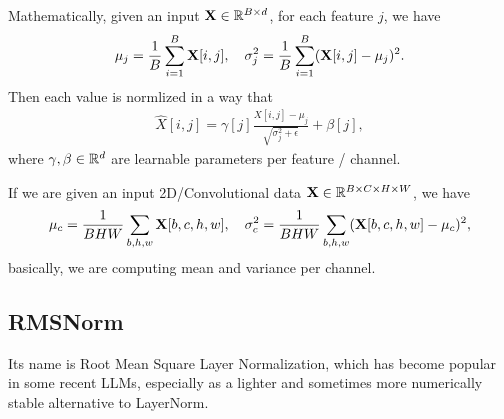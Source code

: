 \documentclass[11pt]{article}  %
\begin{document}
Mathematically, given an input $\mathbf{X} \in \mathbb{R}^{B \times d}$, for each feature $j$, we have 
\begin{align*}
  \mu_j = \frac{1}{B}\sum_{i=1}^{B}\mathbf{X}[i, j], \quad \sigma^2_j = \frac{1}{B}\sum_{i=1}^{B}(\mathbf{X}[i, j] - \mu_j)^2.
\end{align*}
Then each value is normlized in a way that 
\begin{align*}
  \hat{X}[i, j] = \gamma[j] \frac{X[i, j] - \mu_j}{\sqrt{\sigma_j^2 + \epsilon}} + \beta[j],
\end{align*}
where $\gamma, \beta \in \mathbb{R}^d$ are learnable parameters per feature / channel.

If we are given an input 2D/Convolutional data $\mathbf{X} \in \mathbb{R}^{B \times C \times H \times W}$, we have 
\begin{align*}
  \mu_c = \frac{1}{BHW}\sum_{b,h,w}\mathbf{X}[b, c, h, w], \quad \sigma_c^2 = \frac{1}{BHW}\sum_{b,h,w}(\mathbf{X}[b, c, h, w] - \mu_c)^2,
\end{align*}
basically, we are computing mean and variance per channel.

\subsection{RMSNorm}
Its name is Root Mean Square Layer Normalization, which has become popular in some recent LLMs, especially as a lighter and sometimes more numerically stable alternative to LayerNorm.
\end{document}
